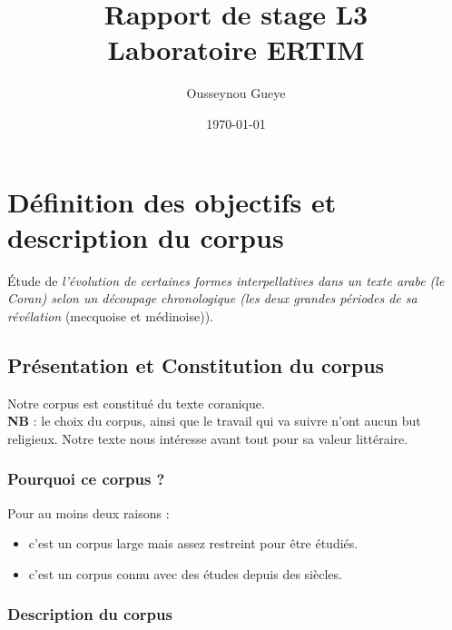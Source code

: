 \documentclass[a4paper,11pt]{report}
\author{Ousseynou Gueye}
\date{\today}
\title{\textbf{Rapport de stage L3 \\ Laboratoire ERTIM}}
\begin{document}
\maketitle
\setcounter{tocdepth}{3}
\tableofcontents

\chapter{Définition des objectifs et description du corpus}
\label{sec-1}

Étude de  \emph{l'évolution de certaines formes interpellatives dans un texte arabe (le Coran) selon un découpage chronologique (les deux grandes périodes de sa révélation} (mecquoise et médinoise)). \\


\section{Présentation et Constitution du corpus}
\label{sec-1-1}

Notre corpus est constitué du texte coranique. \\

\textbf{NB} : le choix du corpus, ainsi que le travail qui va suivre n'ont aucun but religieux. Notre texte nous intéresse avant tout pour sa valeur littéraire. \\

\subsection{Pourquoi ce corpus ?}
\label{sec-1-1-1}

Pour au moins deux raisons : \\
\begin{itemize}
\item c'est un corpus large mais assez restreint pour être étudiés. \\
\item c'est un corpus connu avec des études depuis des siècles. \\
\end{itemize}

\subsection{Description du corpus}
\label{sec-1-1-2}
\end{document}
